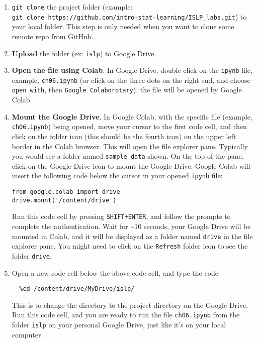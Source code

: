 \documentclass[
  letterpaper,
  DIV=11,
  numbers=noendperiod]{scrreprt}
\begin{document}
\begin{enumerate}
\def\labelenumi{\arabic{enumi}.}
\item
  \texttt{git\ clone} the project folder (example:
  \texttt{git\ clone\ https://github.com/intro-stat-learning/ISLP\_labs.git})
  to your local folder. This step is only needed when you want to clone
  some remote repo from GitHub.
\item
  \textbf{Upload} the folder (ex: \texttt{islp}) to Google Drive.
\item
  \textbf{Open the file using Colab}. In Google Drive, double click on
  the \texttt{ipynb} file, example, \texttt{ch06.ipynb} (or click on the
  three dots on the right end, and choose \texttt{open\ with}, then
  \texttt{Google\ Colaborotary}), the file will be opened by Google
  Colab.
\item
  \textbf{Mount the Google Drive}. In Google Colab, with the specific
  file (example, \texttt{ch06.ipynb}) being opened, move your cursor to
  the first code cell, and then click on the folder icon (this should be
  the fourth icon) on the upper left border in the Colab browser. This
  will open the file explorer pane. Typically you would see a folder
  named \texttt{sample\_data} shown. On the top of the pane, click on
  the Google Drive icon to mount the Google Drive. Google Colab will
  insert the following code below the cursor in your opened
  \texttt{ipynb} file:

\begin{verbatim}
from google.colab import drive
drive.mount('/content/drive')
\end{verbatim}

  Run this code cell by pressing \texttt{SHIFT+ENTER}, and follow the
  prompts to complete the authentication. Wait for \textasciitilde10
  seconds, your Google Drive will be mounted in Colab, and it will be
  displayed as a folder named \texttt{drive} in the file explorer pane.
  You might need to click on the \texttt{Refresh} folder icon to see the
  folder \texttt{drive}.
\item
  Open a new code cell below the above code cell, and type the code

\begin{verbatim}
  %cd /content/drive/MyDrive/islp/
\end{verbatim}

  This is to change the directory to the project directory on the Google
  Drive. Run this code cell, and you are ready to run the file
  \texttt{ch06.ipynb} from the folder \texttt{islp} on your personal
  Google Drive, just like it's on your local computer.
\end{enumerate}
\end{document}

